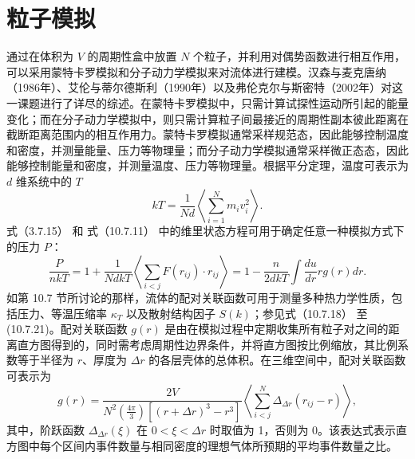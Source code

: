 \section{粒子模拟}\label{ux7c92ux5b50ux6a21ux62df}
通过在体积为 \(V\) 的周期性盒中放置 \(N\) 个粒子，并利用对偶势函数进行相互作用，可以采用蒙特卡罗模拟和分子动力学模拟来对流体进行建模。汉森与麦克唐纳（1986年）、艾伦与蒂尔德斯利（1990年）以及弗伦克尔与斯密特（2002年）对这一课题进行了详尽的综述。在蒙特卡罗模拟中，只需计算试探性运动所引起的能量变化；而在分子动力学模拟中，则只需计算粒子间最接近的周期性副本彼此距离在截断距离范围内的相互作用力。蒙特卡罗模拟通常采样规范态，因此能够控制温度和密度，并测量能量、压力等物理量；而分子动力学模拟通常采样微正态态，因此能够控制能量和密度，并测量温度、压力等物理量。根据平分定理，温度可表示为
\(d\) 维系统中的 \(T\)
\begin{equation}\tag{16.4.1}\label{eq:16.4.1}
k T = \frac { 1 } { N d } \left\langle \sum _ { i = 1 } ^{N} m _ { i } v _ { i } ^{2} \right\rangle .
\end{equation}
式（3.7.15） 和 式（10.7.11） 中的维里状态方程可用于确定任意一种模拟方式下的压力 \(P\)：
\begin{equation}\tag{16.4.2}\label{eq:16.4.2}
\frac { P } { n k T } = 1 + \frac { 1 } { N d k T } \left\langle \sum _ { i < j } F ( r _ { i j } ) \cdot r _ { i j } \right\rangle = 1 - \frac { n } { 2 d k T } \int \frac { d u } { d r } r g ( r ) d r .
\end{equation}
如第 10.7 节所讨论的那样，流体的配对关联函数可用于测量多种热力学性质，包括压力、等温压缩率 \(\kappa_{T}\) 以及散射结构因子 \(S(k)\)；参见式（10.7.18） 至 (10.7.21)。配对关联函数 \(g(r)\) 是由在模拟过程中定期收集所有粒子对之间的距离直方图得到的，同时需考虑周期性边界条件，并将直方图按比例缩放，其比例系数等于半径为 \(r\)、厚度为 \(\Delta r\) 的各层壳体的总体积。在三维空间中，配对关联函数可表示为
\begin{equation}\tag{16.4.3}\label{eq:16.4.3}
g ( r ) = \frac { 2 V } { N ^{2} \left( \frac { 4 \pi } { 3 } \right) \left[ ( r + \Delta r ) ^{3} - r ^{3} \right] } \left\langle \sum _ { i < j } ^{N} \Delta _ { \Delta r } ( r _ { i j } - r ) \right\rangle ,
\end{equation}
其中，阶跃函数 \(\Delta_{\Delta r}(\xi)\) 在 \(0 < \xi < \Delta r\) 时取值为 1，否则为 0。该表达式表示直方图中每个区间内事件数量与相同密度的理想气体所预期的平均事件数量之比。
